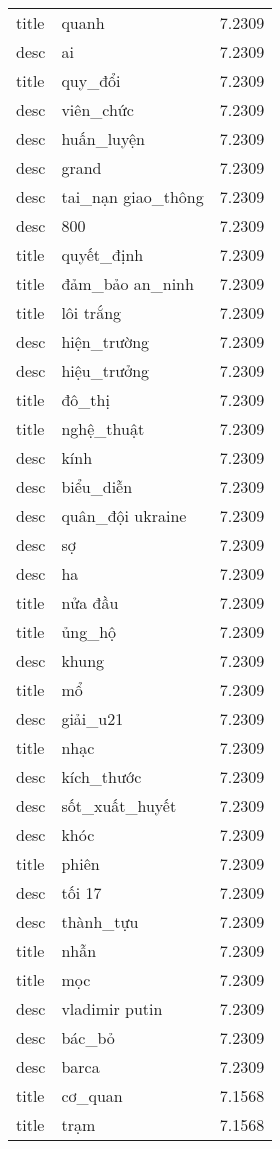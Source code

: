 \documentclass{article}
\begin{document}
\begin{tabular}{lll}
title & quanh & 7.2309\\
desc & ai & 7.2309\\
title & quy\_đổi & 7.2309\\
desc & viên\_chức & 7.2309\\
desc & huấn\_luyện & 7.2309\\
desc & grand & 7.2309\\
desc & tai\_nạn giao\_thông & 7.2309\\
desc & 800 & 7.2309\\
title & quyết\_định & 7.2309\\
title & đảm\_bảo an\_ninh & 7.2309\\
title & lôi trắng & 7.2309\\
desc & hiện\_trường & 7.2309\\
desc & hiệu\_trưởng & 7.2309\\
title & đô\_thị & 7.2309\\
title & nghệ\_thuật & 7.2309\\
desc & kính & 7.2309\\
desc & biểu\_diễn & 7.2309\\
desc & quân\_đội ukraine & 7.2309\\
desc & sợ & 7.2309\\
desc & ha & 7.2309\\
title & nửa đầu & 7.2309\\
title & ủng\_hộ & 7.2309\\
desc & khung & 7.2309\\
title & mổ & 7.2309\\
desc & giải\_u21 & 7.2309\\
title & nhạc & 7.2309\\
desc & kích\_thước & 7.2309\\
desc & sốt\_xuất\_huyết & 7.2309\\
desc & khóc & 7.2309\\
title & phiên & 7.2309\\
desc & tối 17 & 7.2309\\
desc & thành\_tựu & 7.2309\\
title & nhẫn & 7.2309\\
title & mọc & 7.2309\\
desc & vladimir putin & 7.2309\\
desc & bác\_bỏ & 7.2309\\
desc & barca & 7.2309\\
title & cơ\_quan & 7.1568\\
title & trạm & 7.1568\\

\end{tabular}
\end{document}
